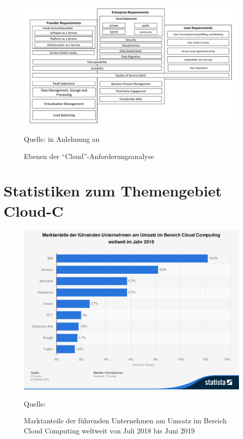 \clearpage
\begin{figure}[H]
	\centering
	\includegraphics[scale=0.50, angle=90]{img/cloudreq.pdf}
	\caption{Ebenen der \enquote{Cloud}-Anforderungsanalyse}
	{\footnotesize Quelle: in Anlehnung an \cite{rimal_architectural_2011}}
	\label{abb:cloudreq}
\end{figure}

\clearpage
\section{Statistiken zum Themengebiet \ac{Cloud-C}}

\begin{figure}[H]
	\centering
	\includegraphics[scale=0.43]{img/statistic_id150979_marktanteile-der-fuehrenden-unternehmen-im-bereich-cloud-computing-weltweit-2019.pdf}
	\caption{Marktanteile der führenden Unternehmen am Umsatz im Bereich Cloud Computing weltweit von Juli 2018 bis Juni 2019}
	{\footnotesize Quelle: \cite{itcandor_cloud_2019}}
	\label{abb:marktanteileCC19}
\end{figure}

